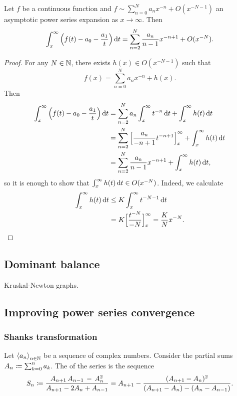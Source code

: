\begin{proposition}
Let $f$ be a continuous function and $f \sim \sum_{n=0}^N a_nx^{-n} + O(x^{-N-1})$ an asymptotic power series expansion as $x\to \infty$. Then
\[ \int_{x}^\infty \Big(f(t) - a_0 - \frac{a_1}{t}\Big) \operatorname{d \!}{t} = \sum_{n=2}^N \frac{a_n}{n-1}x^{-n + 1} + O(x^{-N}). \]
\end{proposition}
\begin{proof}
For any $N\in \mathbb{N}$, there exists $h(x)\in O(x^{-N-1})$ such that
\[ f(x) = \sum_{n=0}^N a_nx^{-n} + h(x). \]
Then
\begin{align*}
\int_{x}^\infty \Big(f(t) - a_0 - \frac{a_1}{t}\Big) \operatorname{d \!}{t} &= \sum_{n=2}^N a_n \int_{x}^\infty t^{-n}\operatorname{d \!}{t} + \int_{x}^\infty h(t)\operatorname{d \!}{t} \\
&= \sum_{n=2}^N \Big[\frac{a_n}{-n+1} t^{-n+1}\Big]_{x}^\infty + \int_{x}^\infty h(t)\operatorname{d \!}{t} \\
&= \sum_{n=2}^N \frac{a_n}{n-1} x^{-n+1} + \int_{x}^\infty h(t)\operatorname{d \!}{t},
\end{align*}
so it is enough to show that $\int_{x}^\infty h(t)\operatorname{d \!}{t}\in O(x^{-N})$. Indeed, we calculate
\begin{align*}
\int_{x}^\infty h(t)\operatorname{d \!}{t} &\leq K\int_x^\infty t^{-N-1} \operatorname{d \!}{t} \\
&= K\Big[\frac{t^{-N}}{-N}\Big]^\infty_x = \frac{K}{N}x^{-N}.
\end{align*}
\end{proof}

\subsection{Dominant balance}

Kruskal-Newton graphs.

\subsection{Improving power series convergence}
\subsubsection{Shanks transformation}
\begin{definition}
Let $\left\langle a_n \right\rangle_{n\in \mathbb{N}}$ be a sequence of complex numbers. Consider the partial sums $A_n \coloneqq \sum_{k=0}^n a_k$. The  of the series is the sequence
\[ S_n \coloneqq {\frac {A_{n+1}\,A_{n-1}\,-\,A_{n}^{2}}{A_{n+1}-2A_{n}+A_{n-1}}}=A_{n+1}-{\frac {(A_{n+1}-A_{n})^{2}}{(A_{n+1}-A_{n})-(A_{n}-A_{n-1})}}. \]
\end{definition}

